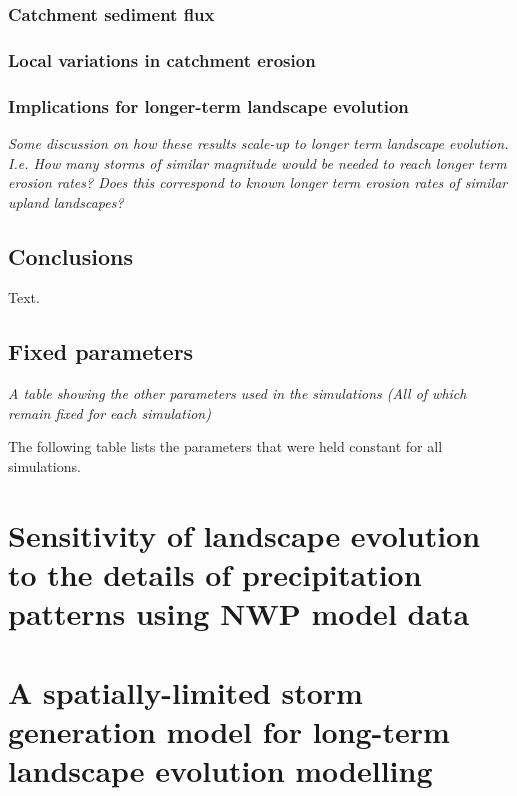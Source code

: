 \documentclass[12pt,oneside,PhD]{muthesis}
\begin{document}
\subsection{Catchment sediment flux}

\subsection{Local variations in catchment erosion}

\subsection{Implications for longer-term landscape evolution}
\textit{Some discussion on how these results scale-up to longer term landscape evolution. I.e. How many storms of similar magnitude would be needed to reach longer term erosion rates? Does this correspond to known longer term erosion rates of similar upland landscapes?}

\section{Conclusions}  %
Text.



\section{Fixed parameters}

\textit{A table showing the other parameters used in the simulations (All of which remain fixed for each simulation)}

The following table lists the parameters that were held constant for all simulations.

\chapter{Sensitivity of landscape evolution to the details of precipitation patterns using NWP model data}

\chapter{A spatially-limited storm generation model for long-term landscape evolution modelling}
\end{document}

